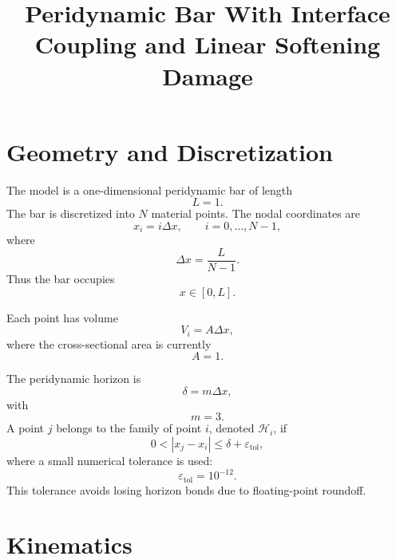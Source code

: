 \documentclass[11pt]{article}
\title{Peridynamic Bar With Interface Coupling and Linear Softening Damage}
\author{}
\date{}
\begin{document}
\maketitle

\section{Geometry and Discretization}

The model is a one-dimensional peridynamic bar of length
\begin{equation}
L = 1 .
\end{equation}
The bar is discretized into \(N\) material points. The nodal coordinates are
\begin{equation}
x_i = i\Delta x,
\qquad i = 0,\ldots,N-1,
\end{equation}
where
\begin{equation}
\Delta x = \frac{L}{N-1}.
\end{equation}
Thus the bar occupies
\begin{equation}
x \in [0,L].
\end{equation}

Each point has volume
\begin{equation}
V_i = A\Delta x,
\end{equation}
where the cross-sectional area is currently
\begin{equation}
A = 1.
\end{equation}

The peridynamic horizon is
\begin{equation}
\delta = m\Delta x,
\end{equation}
with
\begin{equation}
m = 3.
\end{equation}
A point \(j\) belongs to the family of point \(i\), denoted \(\mathcal{H}_i\), if
\begin{equation}
0 < |x_j-x_i| \le \delta + \varepsilon_{\mathrm{tol}},
\end{equation}
where a small numerical tolerance is used:
\begin{equation}
\varepsilon_{\mathrm{tol}} = 10^{-12}.
\end{equation}
This tolerance avoids losing horizon bonds due to floating-point roundoff.

\section{Kinematics}
\end{document}
